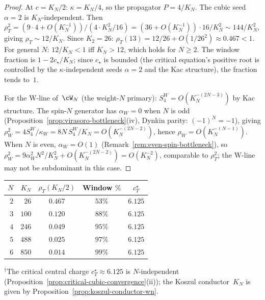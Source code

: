 \begin{proof}
At $c = K_N/2$: $\kappa = K_N/4$, so the propagator
$P = 4/K_N$.  The cubic seed $\alpha = 2$ is
$K_N$-independent.  Then
$\rho_T^2 = (9 \cdot 4 + O(K_N^{-1}))/(4 \cdot K_N^2/16)
= (36 + O(K_N^{-1})) \cdot 16/K_N^2
\sim 144/K_N^2$, giving
$\rho_T \sim 12/K_N$.
Since $K_2 = 26$: $\rho_T(13) = 12/26 + O(1/26^2)
\approx 0.467 < 1$.
For general $N$: $12/K_N < 1$ iff $K_N > 12$, which
holds for $N \geq 2$.
The window fraction is $1 - 2c_\star/K_N$; since
$c_\star$ is bounded (the critical equation's positive
root is controlled by the $\kappa$-independent seeds
$\alpha = 2$ and the Kac structure), the fraction tends
to~$1$.

For the W-line of~$\cW_N$ (the weight-$N$ primary):
$S_4^W = O(K_N^{-(2N-3)})$ by Kac structure.
The spin-$N$ generator has $\alpha_W = 0$ when
$N$ is odd (Proposition~\ref{prop:virasoro-bottleneck}(iv),
Dynkin parity: $(-1)^N = -1$), giving
$\rho_W^2 = 4S_4^W/\kappa_W
= 8N\,S_4^W/K_N = O(K_N^{-(2N-2)})$,
hence $\rho_W = O(K_N^{-(N-1)})$.
When $N$ is even, $\alpha_W = O(1)$
(Remark~\ref{rem:even-spin-bottleneck}), so
$\rho_W^2 = 9\alpha_W^2 N^2/K_N^2 + O(K_N^{-(2N-2)})
= O(K_N^{-2})$, comparable to $\rho_T^2$;
the W-line may not be subdominant in this case.
\end{proof}

\begin{center}
\renewcommand{\arraystretch}{1.2}
\begin{tabular}{rrccc}
\toprule
$N$ & $K_N$ & $\rho_T(K_N/2)$ & Window $\%$
  & $c_T^\star$\rlap{${}^{\dagger}$} \\
\midrule
$2$ & $26$ & $0.467$ & $53\%$ & $6.125$ \\
$3$ & $100$ & $0.120$ & $88\%$ & $6.125$ \\
$4$ & $246$ & $0.049$ & $95\%$ & $6.125$ \\
$5$ & $488$ & $0.025$ & $97\%$ & $6.125$ \\
$6$ & $850$ & $0.014$ & $99\%$ & $6.125$ \\
\bottomrule
\end{tabular}

\smallskip\noindent
{\small ${}^{\dagger}$The critical central charge $c_T^\star \approx 6.125$
is $N$-independent
(Proposition~\ref{prop:critical-cubic-convergence}(ii));
the Koszul conductor~$K_N$ is given by
Proposition~\ref{prop:koszul-conductor-wn}.}
\end{center}

